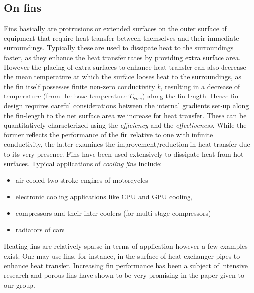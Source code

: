 \documentclass[12pt]{article}
\begin{document}
\subsection{On fins}
Fins basically are protrusions or extended surfaces on the outer surface of equipment that require heat transfer between themselves and their immediate surroundings. Typically these are used to dissipate heat to the surroundings faster, as they enhance the heat transfer rates by providing extra surface area. However the placing of extra surfaces to enhance heat transfer can also decrease the mean temperature at which the surface looses heat to the surroundings, as the fin itself possesses finite non-zero conductivity $k$, resulting in a decrease of temperature (from the base temperature $T_{base}$) along the fin length. Hence fin-design requires careful considerations between the internal gradients set-up along the fin-length to the net surface area we increase for heat transfer. These can be quantitatively characterized using the \emph{efficiency} and the \emph{effectiveness}. While the former reflects the performance of the fin relative to one with infinite conductivity, the latter examines the improvement/reduction in heat-transfer due to its very presence. Fins have been used extensively to dissipate heat from hot surfaces. Typical applications of \emph{cooling fins} include:
\begin{itemize}
    \item air-cooled two-stroke engines of motorcycles
    \item electronic cooling applications like CPU and GPU cooling,
    \item compressors and their inter-coolers (for multi-stage compressors)  
    \item radiators of cars
\end{itemize}
Heating fins are relatively sparse in terms of application however a few examples exist. One may use fins, for instance, in the surface of heat exchanger pipes to  enhance heat transfer. Increasing fin performance has been a subject of intensive research and porous fins have shown to be very promising in the paper given to our group. 
\end{document}
